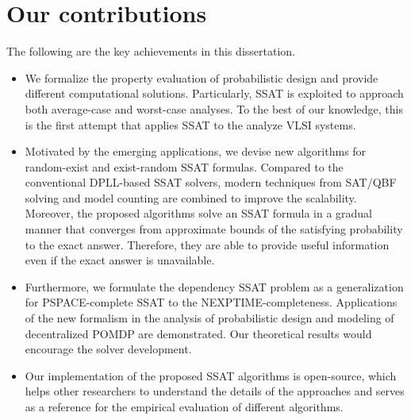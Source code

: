 \section{Our contributions}
The following are the key achievements in this dissertation.
\begin{itemize}
    \item
          We formalize the property evaluation of probabilistic design and provide different computational solutions.
          Particularly, SSAT is exploited to approach both average-case and worst-case analyses.
          To the best of our knowledge, this is the first attempt that applies SSAT to the analyze VLSI systems.
    \item
          Motivated by the emerging applications,
          we devise new algorithms for random-exist and exist-random SSAT formulas.
          Compared to the conventional DPLL-based SSAT solvers,
          modern techniques from SAT/QBF solving and model counting are combined to improve the scalability.
          Moreover, the proposed algorithms solve an SSAT formula in a gradual manner
          that converges from approximate bounds of the satisfying probability to the exact answer.
          Therefore, they are able to provide useful information even if the exact answer is unavailable.
    \item
          Furthermore, we formulate the dependency SSAT problem as a generalization for PSPACE-complete SSAT to the NEXPTIME-completeness.
          Applications of the new formalism in the analysis of probabilistic design and modeling of decentralized POMDP are demonstrated.
          Our theoretical results would encourage the solver development.
    \item
          Our implementation of the proposed SSAT algorithms is open-source,
          which helps other researchers to understand the details of the approaches and
          serves as a reference for the empirical evaluation of different algorithms.
\end{itemize}

